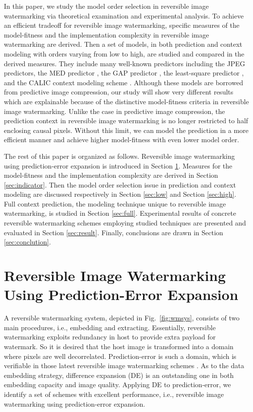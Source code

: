 \documentclass[journal]{IEEEtran}
\begin{document}
In this paper, we study the model order selection in reversible image watermarking via theoretical
examination and experimental analysis. To achieve an efficient tradeoff for reversible image
watermarking, specific measures of the model-fitness and the implementation complexity in reversible
image watermarking are derived. Then a set of models, in both prediction and context modeling with
orders varying from low to high, are studied and compared in the derived measures. They include many
well-known predictors including the JPEG predictors, the MED predictor \cite{Loco00ip}, the GAP
predictor \cite{Wu97calic2}, the least-square predictor \cite{Wu98icip, Li01edp, Kau05lsap}, and the
CALIC context modeling scheme \cite{Wu97calic2, Wu97calic}. Although these models are borrowed from
predictive image compression, our study will show very different results which are explainable
because of the distinctive model-fitness criteria in reversible image watermarking. Unlike the case
in predictive image compression, the prediction context in reversible image watermarking is no
longer restricted to half enclosing causal pixels. Without this limit, we can model the prediction
in a more efficient manner and achieve higher model-fitness with even lower model order.

The rest of this paper is organized as follows. Reversible image watermarking using prediction-error
expansion is introduced in Section \ref{sec:watermark}. Measures for the model-fitness and the
implementation complexity are derived in Section \ref{sec:indicator}. Then the model order
selection issue in prediction and context modeling are discussed respectively in Section
\ref{sec:low} and Section \ref{sec:high}. Full context prediction, the modeling technique unique to
reversible image watermarking, is studied in Section \ref{sec:full}. Experimental results of
concrete reversible watermarking schemes employing studied techniques are presented and evaluated in
Section \ref{sec:result}. Finally, conclusions are drawn in Section \ref{sec:conclution}.

\section{Reversible Image Watermarking Using Prediction-Error Expansion}\label{sec:watermark}

A reversible watermarking system, depicted in Fig.\ \ref{fig:wmsys}, consists of two main
procedures, i.e., embedding and extracting. Essentially, reversible watermarking exploits redundancy
in host to provide extra payload for watermark. So it is desired that the host image is transformed
into a domain where pixels are well decorrelated. Prediction-error is such a domain, which is
verifiable in those latest reversible image watermarking schemes
\cite{Thodi07pee,Kuribayashi08,Chang08pe,Chen09add,Chen09full,Tsai09pe,Weng09pe,Hu2009}. As to the
data embedding strategy, difference expansion (DE) \cite{Tian03de} is an outstanding one in both
embedding capacity and image quality. Applying DE to prediction-error, we identify a set of schemes
with excellent performance, i.e., reversible image watermarking using prediction-error expansion. 
\end{document}
